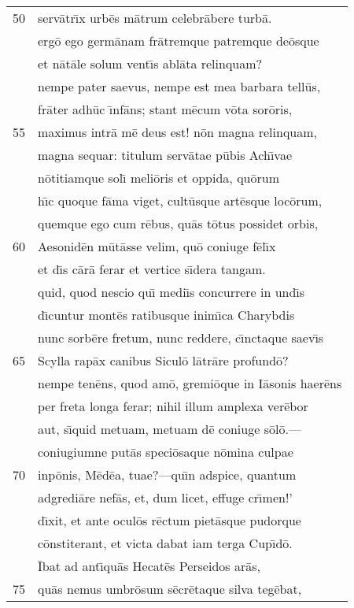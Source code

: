 \documentclass[paper=6in:9in,pagesize=pdftex,
               headinclude=on,footinclude=on,12pt]{scrbook}
\begin{document}
\begin{longtable}[p]{ r l }
50 & serv\=atr\={\i}x urb\=es m\=atrum celebr\=abere turb\=a.\\ 
 & erg\=o ego germ\=anam fr\=atremque patremque de\=osque\\ 
 & et n\=at\=ale solum vent\={\i}s abl\=ata relinquam?\\ 
 & nempe pater saevus, nempe est mea barbara tell\=us,\\ 
 & fr\=ater adh\=uc \={\i}nf\=ans; stant m\=ecum v\=ota sor\=oris,\\ 
55 & maximus intr\=a m\=e deus est! n\=on magna relinquam,\\ 
 & magna sequar: titulum serv\=atae p\=ubis Ach\={\i}vae\\ 
 & n\=otitiamque sol\={\i} meli\=oris et oppida, qu\=orum\\ 
 & h\={\i}c quoque f\=ama viget, cult\=usque art\=esque loc\=orum,\\ 
 & quemque ego cum r\=ebus, qu\=as t\=otus possidet orbis,\\ 
60 & Aesonid\=en m\=ut\=asse velim, qu\=o coniuge f\=el\={\i}x\\ 
 & et d\={\i}s c\=ar\=a ferar et vertice s\={\i}dera tangam.\\ 
 & quid, quod nescio qu\={\i} medi\={\i}s concurrere in und\={\i}s\\ 
 & d\={\i}cuntur mont\=es ratibusque inim\={\i}ca Charybdis\\ 
 & nunc sorb\=ere fretum, nunc reddere, c\={\i}nctaque saev\={\i}s\\ 
65 & Scylla rap\=ax canibus Sicul\=o l\=atr\=are profund\=o?\\ 
 & nempe ten\=ens, quod am\=o, gremi\=oque in I\=asonis haer\=ens\\ 
 & per freta longa ferar; nihil illum amplexa ver\=ebor\\ 
 & aut, s\={\i}quid metuam, metuam d\=e coniuge s\=ol\=o.—\\ 
 & coniugiumne put\=as speci\=osaque n\=omina culpae\\ 
70 & inp\=onis, M\=ed\=ea, tuae?—qu\={\i}n adspice, quantum\\ 
 & adgredi\=are nef\=as, et, dum licet, effuge cr\={\i}men!'\\ 
 & d\={\i}xit, et ante ocul\=os r\=ectum piet\=asque pudorque\\ 
 & c\=onstiterant, et victa dabat iam terga Cup\={\i}d\=o.\\ 
 & \indent \=Ibat ad ant\={\i}qu\=as Hecat\=es Perseidos ar\=as,\\ 
75 & qu\=as nemus umbr\=osum s\=ecr\=etaque silva teg\=ebat,\\ 

\end{longtable}
\end{document}
